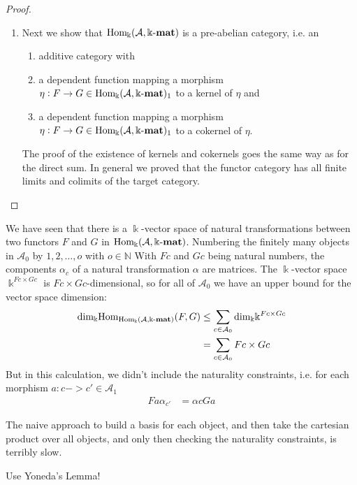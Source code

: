 \begin{proof}
\begin{enumerate}
\item Next we show that $\mathrm{Hom_{\Bbbk}}(\mathcal{A},\Bbbk\textnormal{-}\mathbf{mat})$ is a pre-abelian category, i.e. an
\begin{enumerate}
\renewcommand{\labelenumii}{(\roman{enumii})}
\item additive category with
\item a dependent function mapping a morphism $\eta : F \rightarrow G \in \mathrm{Hom_{\Bbbk}}(\mathcal{A},\Bbbk\textnormal{-}\mathbf{mat})_{1}$ to a kernel of $\eta$ and
\item a dependent function mapping a morphism $\eta : F \rightarrow G \in \mathrm{Hom_{\Bbbk}}(\mathcal{A},\Bbbk\textnormal{-}\mathbf{mat})_{1}$ to a cokernel of $\eta$.
\end{enumerate}
The proof of the existence of kernels and cokernels goes the same way as for the direct sum. In general we proved that the functor category
has all finite limits and colimits of the target category.


\end{enumerate}
\end{proof}

We have seen that there is a $\Bbbk$-vector space of natural transformations between two functors $F$ and $G$ in $\mathrm{Hom_{\Bbbk}}(\mathcal{A},\Bbbk\textnormal{-}\mathbf{mat})$.
Numbering the finitely many objects in $\mathcal{A}_{0}$ by $1,2,\dots,o$ with $o \in \mathbb{N}$
With $Fc$ and $Gc$ being natural numbers, the components $\alpha_{c}$ of a natural transformation $\alpha$ are matrices.
The $\Bbbk$-vector space $\Bbbk^{Fc\times Gc}$ is $Fc\times Gc$-dimensional, so for all of $\mathcal{A}_{0}$ we have an
upper bound for the vector space dimension:
\begin{align}
\mathrm{dim}_{\Bbbk} \mathrm{Hom}_{\mathrm{Hom_{\Bbbk}}(\mathcal{A},\Bbbk\textnormal{-}\mathbf{mat})}(F,G) &\leq \sum_{c\in \mathcal{A}_{0}} \mathrm{dim}_{\Bbbk} \Bbbk^{Fc\times Gc} \\
    &= \sum_{c\in \mathcal{A}_{0}} Fc\times Gc
\end{align}
But in this calculation, we didn't include the naturality constraints, i.e. for each morphism $a : c -> c' \in \mathcal{A}_{1}$
\begin{align}
Fa \alpha_{c'} &= \alpha{c} Ga
\end{align}

The naive approach to build a basis for each object, and then take the cartesian product over all objects, and only then
checking the naturality constraints, is terribly slow.

Use Yoneda's Lemma!



